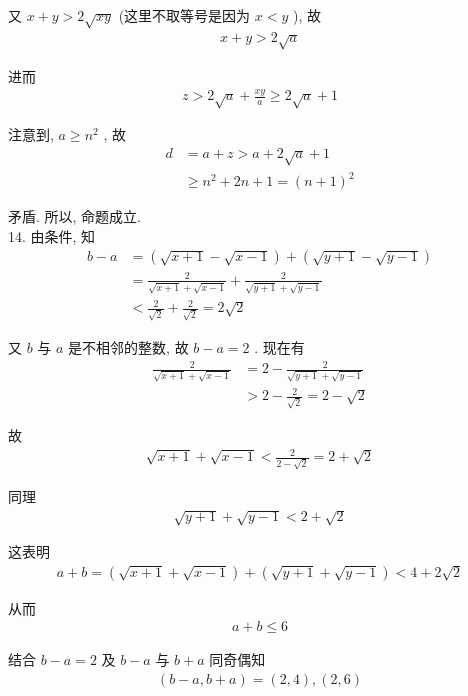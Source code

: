 又 $x+y>2 \sqrt{x y}$ (这里不取等号是因为 $x<y$ ), 故
\begin{align*}
	x+y>2 \sqrt{a}
\end{align*}

进而
\begin{align*}
	z>2 \sqrt{a}+\frac{x y}{a} \geqslant 2 \sqrt{a}+1
\end{align*}

注意到,  $a \geqslant n^{2}$ , 故\begin{align}
	d & =a+z>a+2 \sqrt{a}+1             \\
	  & \geqslant n^{2}+2 n+1=(n+1)^{2}
\end{align}

矛盾. 所以, 命题成立.\\
14. 由条件, 知\begin{align}
	b-a & =(\sqrt{x+1}-\sqrt{x-1})+(\sqrt{y+1}-\sqrt{y-1})                 \\
	    & =\frac{2}{\sqrt{x+1}+\sqrt{x-1}}+\frac{2}{\sqrt{y+1}+\sqrt{y-1}} \\
	    & <\frac{2}{\sqrt{2}}+\frac{2}{\sqrt{2}}=2 \sqrt{2}
\end{align}

又 $b$ 与 $a$ 是不相邻的整数, 故 $b-a=2$ . 现在有\begin{align}
	\frac{2}{\sqrt{x+1}+\sqrt{x-1}} & =2-\frac{2}{\sqrt{y+1}+\sqrt{y-1}} \\
	                                & >2-\frac{2}{\sqrt{2}}=2-\sqrt{2}
\end{align}

故
\begin{align*}
	\sqrt{x+1}+\sqrt{x-1}<\frac{2}{2-\sqrt{2}}=2+\sqrt{2}
\end{align*}

同理
\begin{align*}
	\sqrt{y+1}+\sqrt{y-1}<2+\sqrt{2}
\end{align*}

这表明
\begin{align*}
	a+b=(\sqrt{x+1}+\sqrt{x-1})+(\sqrt{y+1}+\sqrt{y-1})<4+2 \sqrt{2}
\end{align*}

从而
\begin{align*}
	a+b \leqslant 6
\end{align*}

结合 $b-a=2$ 及 $b-a$ 与 $b+a$ 同奇偶知
\begin{align*}
	(b-a, b+a)=(2,4),(2,6)
\end{align*}

